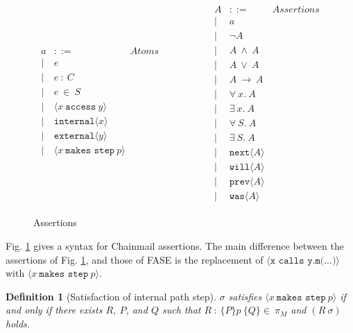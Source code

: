 \documentclass[12pt]{article}
\newtheorem{definition}{Definition}
\begin{document}
	
	\begin{figure}[h]
	\[
	\begin{array}{lcr}
	\begin{array}{llr}
	a & ::= &\textit{Atoms}\\ 
	| & e & \\
	| & e\ :\ C & \\
	| & e\ \in\ S & \\
	| & \langle x\ \texttt{access}\ y \rangle &\\
	| & \texttt{internal}\langle x \rangle &\\
	| & \texttt{external}\langle y \rangle &\\
	| & \langle x\ \texttt{makes step}\ p \rangle & \\
	\end{array}&
	~~~~~~~~~~~~~~~ &
	\begin{array}{llr}
	A & ::= & \textit{Assertions}\\ 
	| & a & \\
	| & \neg A & \\
	| & A\ \wedge\ A & \\
	| & A\ \vee\ A & \\
	| & A\ \longrightarrow\ A & \\
	| & \forall\ x.\ A & \\
	| & \exists\ x.\ A & \\
	| & \forall\ S.\ A & \\
	| & \exists\ S.\ A & \\
	| & \texttt{next}\langle  A \rangle& \\
	| & \texttt{will}\langle  A \rangle& \\
	| & \texttt{prev}\langle  A \rangle& \\
	| & \texttt{was}\langle  A \rangle& 
	\end{array}
	\end{array}
	\]
	\caption{Assertions}
	\label{f:assertions}
	\end{figure}
	
	Fig. \ref{f:assertions} gives a syntax for Chainmail assertions.
	The main difference between the assertions of Fig. \ref{f:assertions}, and those of FASE is the 
	replacement of $\langle\texttt{x calls y.m(...)}\rangle$ with $\langle x\ \texttt{makes step}\ p\rangle$.
	
	\begin{definition}[Satisfaction of internal path step]
	$\sigma$ satisfies $\langle x\ \texttt{makes step}\ p \rangle$ if and only if there exists $R$, $P$, and $Q$ such that $R\ :\ \{P\}p\ \{Q\} \in\ \pi_M$ and
	$(R\ \sigma)$ holds.
	\end{definition}
	
\end{document}
